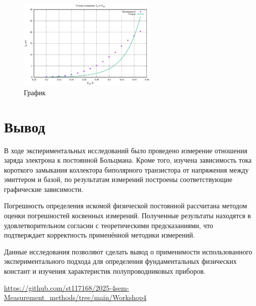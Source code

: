 \begin{figure}[H]
\centering
\includegraphics[width=0.6\textwidth]{plot4_3.eps}
\caption{График}
\label{fig:device}
\end{figure}


\section{Вывод}
В ходе экспериментальных исследований было проведено измерение отношения заряда электрона к постоянной Больцмана. Кроме того, изучена зависимость тока короткого замыкания коллектора биполярного транзистора от напряжения между эмиттером и базой, по результатам измерений построены соответствующие графические зависимости.

Погрешность определения искомой физической постоянной рассчитана методом оценки погрешностей косвенных измерений. Полученные результаты находятся в удовлетворительном согласии с теоретическими предсказаниями, что подтверждает корректность применённой методики измерений.

Данные исследования позволяют сделать вывод о применимости использованного экспериментального подхода для определения фундаментальных физических констант и изучения характеристик полупроводниковых приборов.

\begin{thebibliography}{9}

\url{https://github.com/st117168/2025-4sem-Measurement_methods/tree/main/Workshop4} 

\end{thebibliography}

\appendix